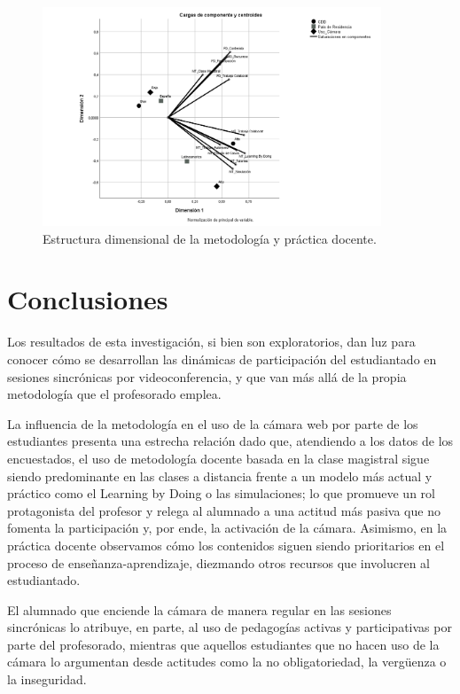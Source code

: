 \documentclass[spanish]{textolivre}
\begin{document}
\begin{figure}[h!]
    \centering
    \includegraphics[width=0.9\textwidth]{fig03.png}
    \caption{Estructura dimensional de la metodología y práctica docente.}
    \label{fig03}
\end{figure}

\section{Conclusiones}

Los resultados de esta investigación, si bien son exploratorios, dan luz para conocer cómo se desarrollan las dinámicas de participación del estudiantado en sesiones sincrónicas por videoconferencia, y que van más allá de la propia metodología que el profesorado emplea.

La influencia de la metodología en el uso de la cámara web por parte de los estudiantes presenta una estrecha relación dado que, atendiendo a los datos de los encuestados, el uso de metodología docente basada en la clase magistral sigue siendo predominante en las clases a distancia frente a un modelo más actual y práctico como el Learning by Doing o las simulaciones; lo que promueve un rol protagonista del profesor y relega al alumnado a una actitud más pasiva que no fomenta la participación y, por ende, la activación de la cámara. Asimismo, en la práctica docente observamos cómo los contenidos siguen siendo prioritarios en el proceso de enseñanza-aprendizaje, diezmando otros recursos que involucren al estudiantado.

El alumnado que enciende la cámara de manera regular en las sesiones sincrónicas lo atribuye, en parte, al uso de pedagogías activas y participativas por parte del profesorado, mientras que aquellos estudiantes que no hacen uso de la cámara lo argumentan desde actitudes como la no obligatoriedad, la vergüenza o la inseguridad.
\end{document}
